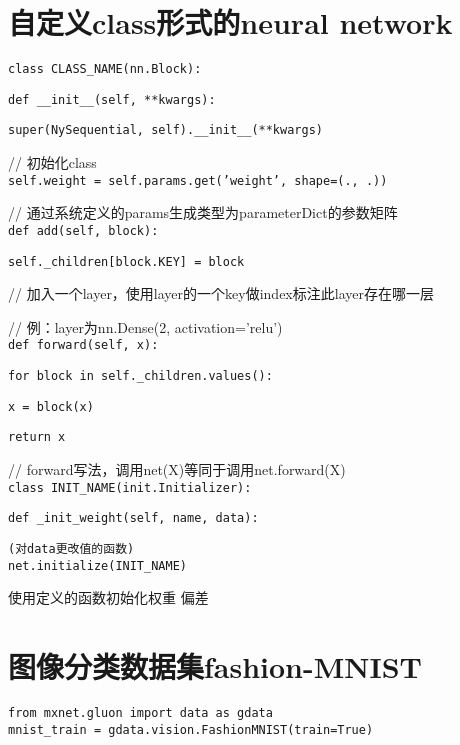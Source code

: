 \documentclass[UTF8]{ctexart}
\begin{document}
\section{自定义class形式的neural network}
\noindent \texttt{class CLASS\_NAME(nn.Block):}

  \texttt{def \_\_init\_\_(self, **kwargs):}

  \quad \texttt{super(NySequential, self).\_\_init\_\_(**kwargs)}

  // 初始化class\\

  \quad \texttt{self.weight = self.params.get('weight', shape=(., .))}

  // 通过系统定义的params生成类型为parameterDict的参数矩阵\\

  \texttt{def add(self, block):}

  \quad \texttt{self.\_children[block.KEY] = block}

  // 加入一个layer，使用layer的一个key做index标注此layer存在哪一层

  // 例：layer为nn.Dense(2, activation='relu')\\

  \texttt{def forward(self, x):}

  \quad \texttt{for block in self.\_children.values():}

  \quad \quad \texttt{x = block(x)}

  \quad \quad \texttt{return x}

  // forward写法，调用net(X)等同于调用net.forward(X)\\
\texttt{class INIT\_NAME(init.Initializer):}

  \texttt{def \_init\_weight(self, name, data):}

  \quad \texttt{(对data更改值的函数)}\\
\texttt{net.initialize(INIT\_NAME)}

  使用定义的函数初始化权重 偏差

\section{图像分类数据集fashion-MNIST}
\noindent \texttt{from mxnet.gluon import data as gdata}\\
\texttt{mnist\_train = gdata.vision.FashionMNIST(train=True)} 
\end{document}
